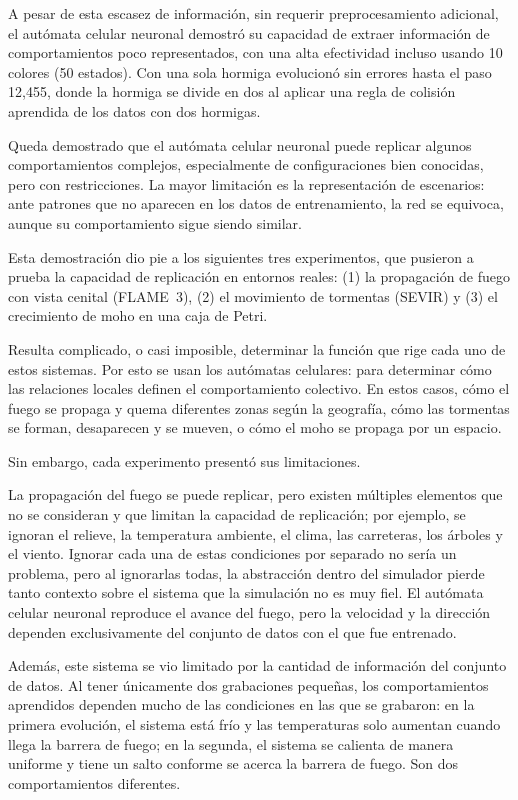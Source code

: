 A pesar de esta escasez de información, sin requerir preprocesamiento adicional, el autómata celular neuronal demostró su capacidad de extraer información de comportamientos poco representados, con una alta efectividad incluso usando 10 colores (50 estados). Con una sola hormiga evolucionó sin errores hasta el paso 12,455, donde la hormiga se divide en dos al aplicar una regla de colisión aprendida de los datos con dos hormigas.

Queda demostrado que el autómata celular neuronal puede replicar algunos comportamientos complejos, especialmente de configuraciones bien conocidas, pero con restricciones. La mayor limitación es la representación de escenarios: ante patrones que no aparecen en los datos de entrenamiento, la red se equivoca, aunque su comportamiento sigue siendo similar.

Esta demostración dio pie a los siguientes tres experimentos, que pusieron a prueba la capacidad de replicación en entornos reales: (1) la propagación de fuego con vista cenital (FLAME~3), (2) el movimiento de tormentas (SEVIR) y (3) el crecimiento de moho en una caja de Petri.

Resulta complicado, o casi imposible, determinar la función que rige cada uno de estos sistemas. Por esto se usan los autómatas celulares: para determinar cómo las relaciones locales definen el comportamiento colectivo. En estos casos, cómo el fuego se propaga y quema diferentes zonas según la geografía, cómo las tormentas se forman, desaparecen y se mueven, o cómo el moho se propaga por un espacio.

Sin embargo, cada experimento presentó sus limitaciones.

La propagación del fuego se puede replicar, pero existen múltiples elementos que no se consideran y que limitan la capacidad de replicación; por ejemplo, se ignoran el relieve, la temperatura ambiente, el clima, las carreteras, los árboles y el viento. Ignorar cada una de estas condiciones por separado no sería un problema, pero al ignorarlas todas, la abstracción dentro del simulador pierde tanto contexto sobre el sistema que la simulación no es muy fiel. El autómata celular neuronal reproduce el avance del fuego, pero la velocidad y la dirección dependen exclusivamente del conjunto de datos con el que fue entrenado.

Además, este sistema se vio limitado por la cantidad de información del conjunto de datos. Al tener únicamente dos grabaciones pequeñas, los comportamientos aprendidos dependen mucho de las condiciones en las que se grabaron: en la primera evolución, el sistema está frío y las temperaturas solo aumentan cuando llega la barrera de fuego; en la segunda, el sistema se calienta de manera uniforme y tiene un salto conforme se acerca la barrera de fuego. Son dos comportamientos diferentes.

